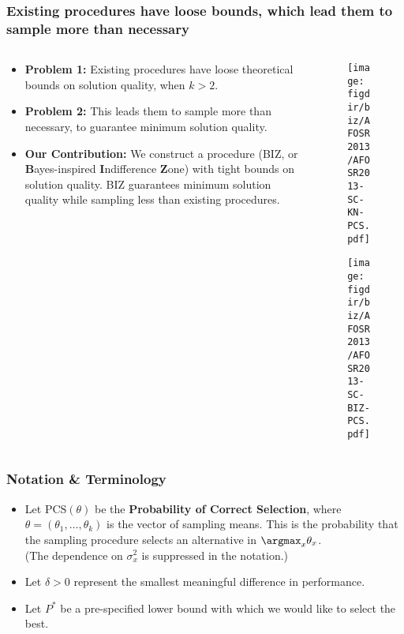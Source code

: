 \documentclass[13pt]{beamer}
\newcommand{\figdir}{../../fig}
\newcommand{\PCS}{\mathrm{PCS}}
\begin{document}
\begin{frame}\frametitle{Existing procedures have loose bounds, which lead them to sample more than necessary}
  \begin{columns}[t]
    \begin{column}{0.6\textwidth}
      \begin{itemize}
	\item {\bf Problem 1:} Existing procedures have loose theoretical bounds on solution quality, when $k>2$.  
	\item {\bf Problem 2:} This leads them to sample more than necessary, to guarantee minimum solution quality. 
	\item {\bf Our Contribution:} We construct a procedure (BIZ, or {\bf B}ayes-inspired {\bf I}ndifference {\bf Z}one) with tight bounds on solution quality.  BIZ guarantees minimum solution quality while sampling less than existing procedures.
      \end{itemize}
    \end{column}
    \begin{column}{0.4\textwidth}
      \begin{figure}
	\center
	\texttt{[image: \\figdir/biz/AFOSR2013/AFOSR2013-SC-KN-PCS.pdf]}
      \end{figure}
      \medskip
      \begin{figure}
	\center
	\texttt{[image: \\figdir/biz/AFOSR2013/AFOSR2013-SC-BIZ-PCS.pdf]}
      \end{figure}
    \end{column}
  \end{columns}
\end{frame}




\begin{frame} \frametitle{Notation \& Terminology}
  \begin{itemize}
    \item Let $\PCS(\theta)$ be the {\bf Probability of Correct Selection}, where $\theta=(\theta_1,\ldots,\theta_k)$ is the vector of sampling means. 
      This is the probability that the sampling procedure selects an alternative in $\argmax_x \theta_x$.\\
    (The dependence on $\sigma^2_x$ is suppressed in the notation.)
    \item Let $\delta > 0$ represent the smallest meaningful difference in performance.
    \item Let $P^*$ be a pre-specified lower bound with which we would like to select the best. 
  \end{itemize}
\end{frame}
\end{document}
